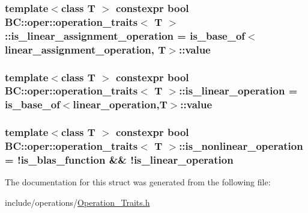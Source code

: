 \subsubsection[{\texorpdfstring{is\+\_\+linear\+\_\+assignment\+\_\+operation}{is_linear_assignment_operation}}]{\setlength{\rightskip}{0pt plus 5cm}template$<$class T $>$ constexpr bool {\bf B\+C\+::oper\+::operation\+\_\+traits}$<$ T $>$\+::is\+\_\+linear\+\_\+assignment\+\_\+operation = is\+\_\+base\+\_\+of$<${\bf linear\+\_\+assignment\+\_\+operation}, T$>$\+::value\hspace{0.3cm}{\ttfamily [static]}}\hypertarget{structBC_1_1oper_1_1operation__traits_a87a889313432e09fde4493f622e9875d}{}\label{structBC_1_1oper_1_1operation__traits_a87a889313432e09fde4493f622e9875d}
\subsubsection[{\texorpdfstring{is\+\_\+linear\+\_\+operation}{is_linear_operation}}]{\setlength{\rightskip}{0pt plus 5cm}template$<$class T $>$ constexpr bool {\bf B\+C\+::oper\+::operation\+\_\+traits}$<$ T $>$\+::is\+\_\+linear\+\_\+operation = is\+\_\+base\+\_\+of$<${\bf linear\+\_\+operation},T$>$\+::value\hspace{0.3cm}{\ttfamily [static]}}\hypertarget{structBC_1_1oper_1_1operation__traits_adae4b22fd29b6ec139a618448722c079}{}\label{structBC_1_1oper_1_1operation__traits_adae4b22fd29b6ec139a618448722c079}
\subsubsection[{\texorpdfstring{is\+\_\+nonlinear\+\_\+operation}{is_nonlinear_operation}}]{\setlength{\rightskip}{0pt plus 5cm}template$<$class T $>$ constexpr bool {\bf B\+C\+::oper\+::operation\+\_\+traits}$<$ T $>$\+::is\+\_\+nonlinear\+\_\+operation = !{\bf is\+\_\+blas\+\_\+function} \&\& !{\bf is\+\_\+linear\+\_\+operation}\hspace{0.3cm}{\ttfamily [static]}}\hypertarget{structBC_1_1oper_1_1operation__traits_ad34eaf715b8d853ffe778bacd670ab4c}{}\label{structBC_1_1oper_1_1operation__traits_ad34eaf715b8d853ffe778bacd670ab4c}


The documentation for this struct was generated from the following file\+:\begin{DoxyCompactItemize}
\item 
include/operations/\hyperlink{Operation__Traits_8h}{Operation\+\_\+\+Traits.\+h}\end{DoxyCompactItemize}
